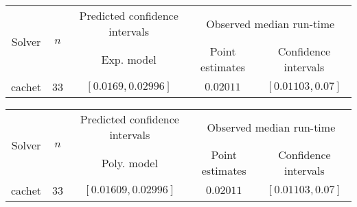 \begin{tabular}{ccccc}
\hline 
\multirow{2}{*}{Solver} & \multirow{2}{*}{$n$} & Predicted confidence intervals & \multicolumn{2}{c}{Observed median  run-time}\tabularnewline
 &  & Exp. model  & Point estimates  & Confidence intervals\tabularnewline
\hline 
\hline 
\multirow{0}{*}{cachet} & 33 & $\mathbf{\left[0.0169,0.02996\right]}$ & $0.02011$ & $\left[0.01103,0.07\right]$ \tabularnewline 
\hline 
\end{tabular} 

\begin{tabular}{ccccc}
\hline 
\multirow{2}{*}{Solver} & \multirow{2}{*}{$n$} & Predicted confidence intervals & \multicolumn{2}{c}{Observed median  run-time}\tabularnewline
 &  & Poly. model  & Point estimates  & Confidence intervals\tabularnewline
\hline 
\hline 
\multirow{0}{*}{cachet} & 33 & $\mathbf{\left[0.01609,0.02996\right]}$ & $0.02011$ & $\left[0.01103,0.07\right]$ \tabularnewline 
\hline 
\end{tabular} 


